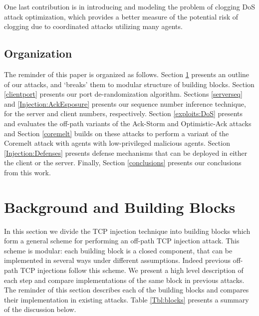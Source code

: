 \documentclass[conference]{IEEEtran}
\begin{document}
One last contribution is in introducing and modeling the problem of clogging DoS attack optimization, which provides a better measure of the potential risk of clogging due to coordinated attacks utilizing many agents. 







\subsection{Organization}
The reminder of this paper is organized as follows. Section \ref{background} presents an outline of our attacks, and `breaks' them to modular structure of building blocks. Section \ref{clientport} presents our port de-randomization algorithm. Sections \ref{serverseq} and  \ref{Injection:AckEsposure} presents our sequence number inference technique, for the server and client numbers, respectively. Section \ref{exploits:DoS} presents and evaluates the off-path variants of the Ack-Storm and Optimistic-Ack attacks and Section \ref{coremelt} builds on these attacks to perform a variant of the Coremelt attack with agents with low-privileged malicious agents. Section \ref{Injection:Defenses} presents defense mechanisms that can be deployed in either the client or the server. Finally, Section \ref{conclusions} presents our conclusions from this work.













\section{Background and Building Blocks} \label{background}

In this section we divide the TCP injection technique into building blocks which form a general scheme for performing an off-path TCP injection attack. This scheme is modular: each building block is a closed component, that can be implemented in several ways under different assumptions. Indeed previous off-path TCP injections \cite{woottcp,snptcp,lkm:phrack:07} follow this scheme. We present a high level description of each step and compare implementations of the same block in previous attacks. The reminder of this section describes each of the building blocks and compares their implementation in existing attacks. Table \ref{Tbl:blocks} presents a summary of the discussion below.
\end{document}
